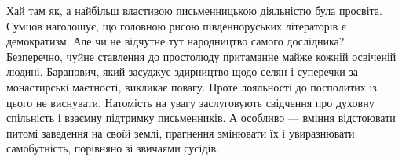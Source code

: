 Хай там як, а найбільш властивою письменницькою діяльністю була просвіта.
Сумцов наголошує, що головною рисою південноруських літераторів є демократизм.
Але чи не відчутне тут народництво самого дослідника? Безперечно, чуйне
ставлення до простолюду притаманне майже кожній освіченій людині. Баранович,
який засуджує здирництво щодо селян і суперечки за монастирські маєтності,
викликає повагу. Проте лояльності до посполитих із цього не виснувати.
Натомість на увагу заслуговують свідчення про духовну спільність і взаємну
підтримку письменників. А особливо — вміння відстоювати питомі заведення на
своїй землі, прагнення змінювати їх і увиразнювати самобутність, порівняно зі
звичаями сусідів. 
